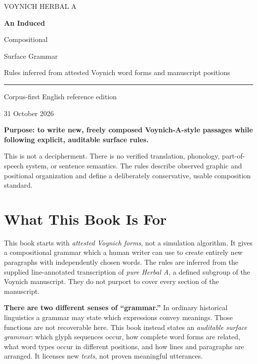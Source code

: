 \documentclass[11pt,a4paper]{article}
\begin{document}
\begin{titlepage}
\vspace*{30mm}
{\sffamily\Large\color{accent} VOYNICH HERBAL A\par}
\vspace{10mm}
{\sffamily\Huge\bfseries\color{ink} An Induced\par Compositional\par Surface Grammar\par}
\vspace{11mm}
{\Large\color{ink} Rules inferred from attested Voynich word forms and manuscript positions\par}
\vspace{15mm}
\hrule\vspace{8mm}
{\large Corpus-first English reference edition\par}
{\large 31 October 2026\par}
\vfill
{\bfseries Purpose: to write new, freely composed Voynich-A-style passages while following explicit, auditable surface rules.}\par\vspace{9mm}
{\small This is not a decipherment. There is no verified translation, phonology, part-of-speech system, or sentence semantics. The rules describe observed graphic and positional organization and define a deliberately conservative, usable composition standard.}\par
\end{titlepage}
\tableofcontents
\clearpage

\section{What This Book Is For}
This book starts with \emph{attested Voynich forms}, not a simulation algorithm. It gives a compositional grammar which a human writer can use to create entirely new paragraphs with independently chosen words. The rules are inferred from the supplied line-annotated transcription of \emph{pure Herbal A}, a defined subgroup of the Voynich manuscript. They do not purport to cover every section of the manuscript.

\textbf{There are two different senses of ``grammar.''} In ordinary historical linguistics a grammar may state which expressions convey meanings. Those functions are not recoverable here. This book instead states an \emph{auditable surface grammar}: which glyph sequences occur, how complete word forms are related, what word types occur in different positions, and how lines and paragraphs are arranged. It licenses new \emph{texts}, not proven meaningful utterances.
\end{document}
